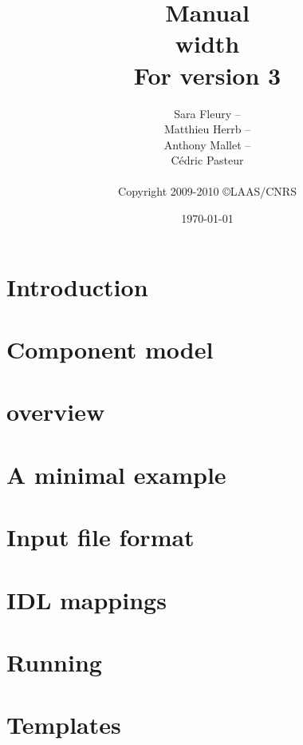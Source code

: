 \documentclass[a4paper,11pt]{book}
\title{{\Huge\bfseries \GenoM{} Manual}\\ \vrule height 2pt width \linewidth\\
         \hfill\small For \GenoM{} version 3}
\author{
   Sara Fleury -- {\email{sara.fleury@laas.fr}}\\
   Matthieu Herrb -- {\email{matthieu.herrb@laas.fr}}\\
   Anthony Mallet -- {\email{anthony.mallet@laas.fr}}\\
   C\'edric Pasteur\\
   \hfill\\
   Copyright 2009-2010 \copyright LAAS/CNRS
}
\date{\today}
\begin{document}

\frontmatter
\maketitle
\tableofcontents
\mainmatter

\chapter{Introduction}

\chapter{Component model}
\label{chapter:model}

\chapter{\GenoM{} overview}
\label{chapter:genom}

\chapter{A minimal example}

\chapter{Input file format}
\label{chapter:iff}


\chapter{\GenoM{} IDL mappings}
\label{chapter:mappings}

\chapter{Running \GenoM{}}
\label{chapter:run}


\chapter{Templates}
\label{chapter:tmpl}


\backmatter

\printindex
\end{document}
